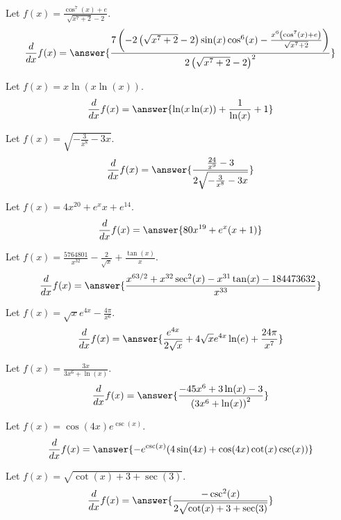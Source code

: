 \documentclass{ximera}
\begin{document}
\begin{shuffle}
\begin{exercise}
Let $f(x)=\frac{\cos ^7(x)+e}{\sqrt{x^7+2}-2}$.
\[
\ddx f(x) = \answer{\frac{7 \left(-2 \left(\sqrt{x^7+2}-2\right) \sin (x) \cos ^6(x)-\frac{x^6 \left(\cos ^7(x)+e\right)}{\sqrt{x^7+2}}\right)}{2 \left(\sqrt{x^7+2}-2\right)^2}}
\]
\end{exercise}

\begin{exercise}
Let $f(x)=x \ln (x \ln (x))$.
\[
\ddx f(x) = \answer{\ln (x \ln (x))+\frac{1}{\ln (x)}+1}
\]
\end{exercise}

\begin{exercise}
Let $f(x)=\sqrt{-\frac{3}{x^8}-3 x}$.
\[
\ddx f(x) = \answer{\frac{\frac{24}{x^9}-3}{2 \sqrt{-\frac{3}{x^8}-3 x}}}
\]
\end{exercise}

\begin{exercise}
Let $f(x)=4 x^{20}+e^x x+e^{14}$.
\[
\ddx f(x) = \answer{80 x^{19}+e^x (x+1)}
\]
\end{exercise}

\begin{exercise}
Let $f(x)=\frac{5764801}{x^{32}}-\frac{2}{\sqrt{x}}+\frac{\tan (x)}{x}$.
\[
\ddx f(x) = \answer{\frac{x^{63/2}+x^{32} \sec ^2(x)-x^{31} \tan (x)-184473632}{x^{33}}}
\]
\end{exercise}

\begin{exercise}
Let $f(x)=\sqrt{x} e^{4 x}-\frac{4 \pi }{x^6}$.
\[
\ddx f(x) = \answer{\frac{e^{4 x}}{2 \sqrt{x}}+4 \sqrt{x} e^{4 x} \ln (e)+\frac{24 \pi }{x^7}}
\]
\end{exercise}

\begin{exercise}
Let $f(x)=\frac{3 x}{3 x^6+\ln (x)}$.
\[
\ddx f(x) = \answer{\frac{-45 x^6+3 \ln (x)-3}{\left(3 x^6+\ln (x)\right)^2}}
\]
\end{exercise}

\begin{exercise}
Let $f(x)=\cos (4 x) e^{\csc (x)}$.
\[
\ddx f(x) = \answer{-e^{\csc (x)} (4 \sin (4 x)+\cos (4 x) \cot (x) \csc (x))}
\]
\end{exercise}

\begin{exercise}
Let $f(x)=\sqrt{\cot (x)+3+\sec (3)}$.
\[
\ddx f(x) = \answer{\frac{-\csc^2(x)}{2 \sqrt{\cot (x)+3+\sec (3)}}}
\]
\end{exercise}


\end{shuffle}
\end{document}
